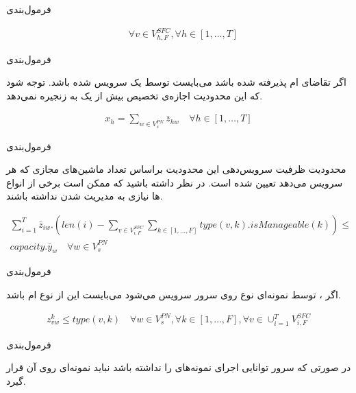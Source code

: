 \documentclass{beamer}
\begin{document}
\begin{persian}
\begin{frame}{فرمول‌بندی}
\begin{latin}
\begin{align}
        \quad
        \forall v \in V_{h,F}^{SFC}, \forall h \in [1,\ldots, T]
    \end{align}\end{latin}
\end{frame}
\begin{frame}{فرمول‌بندی}
    \par
    اگر تقاضای ام پذیرفته شده باشد
    می‌بایست توسط یک  سرویس شده باشد.
    توجه شود که این محدودیت اجازه‌ی تخصیص بیش از یک 
    به زنجیره نمی‌دهد.
    \begin{latin}\begin{align}
        x_h = \sum_{w \in V_{s}^{PN}} \bar{z}_{hw}
        \quad
        \forall h \in [1,\ldots, T]
    \end{align}\end{latin}
\end{frame}
\begin{frame}{فرمول‌بندی}
    \par
    محدودیت ظرفیت سرویس‌دهی 
    این محدودیت براساس تعداد ماشین‌های مجازی که هر
    سرویس می‌دهد تعیین شده است.
    در نظر داشته باشید که ممکن است برخی از انواع
    ‌ها
    نیازی به مدیریت شدن نداشته باشند.

    \begin{latin}
        \begin{align}
            \sum_{i=1}^{T} \bar{z}_{iw} . (len(i) - \sum_{v \in V_{i, F}^{SFC}} \sum_{k \in [1, \dots, F]} type(v, k) . isManageable(k)) \le \nonumber \\
            capacity . \bar{y}_{w}
            \quad
            \forall w \in V_{s}^{PN}
        \end{align}
    \end{latin}
\end{frame}
\begin{frame}{فرمول‌بندی}
    \par
    اگر ، 
    توسط نمونه‌ای نوع 
    روی سرور  سرویس می‌شود می‌بایست
    این  از نوع ام باشد.
    \begin{latin}\begin{align}
        z_{vw}^{k} \le type(v, k)
        \quad
        \forall w \in V_{s}^{PN},
        \forall k \in [1,\ldots, F],
        \forall v \in \cup_{i=1}^T V_{i, F}^{SFC}
    \end{align}\end{latin}
\end{frame}
\begin{frame}{فرمول‌بندی}
    \par
    در صورتی که سرور 
    توانایی اجرای نمونه‌های 
    را نداشته باشد نباید نمونه‌ای روی آن قرار گیرد.


\end{frame}
\end{persian}
\end{document}
